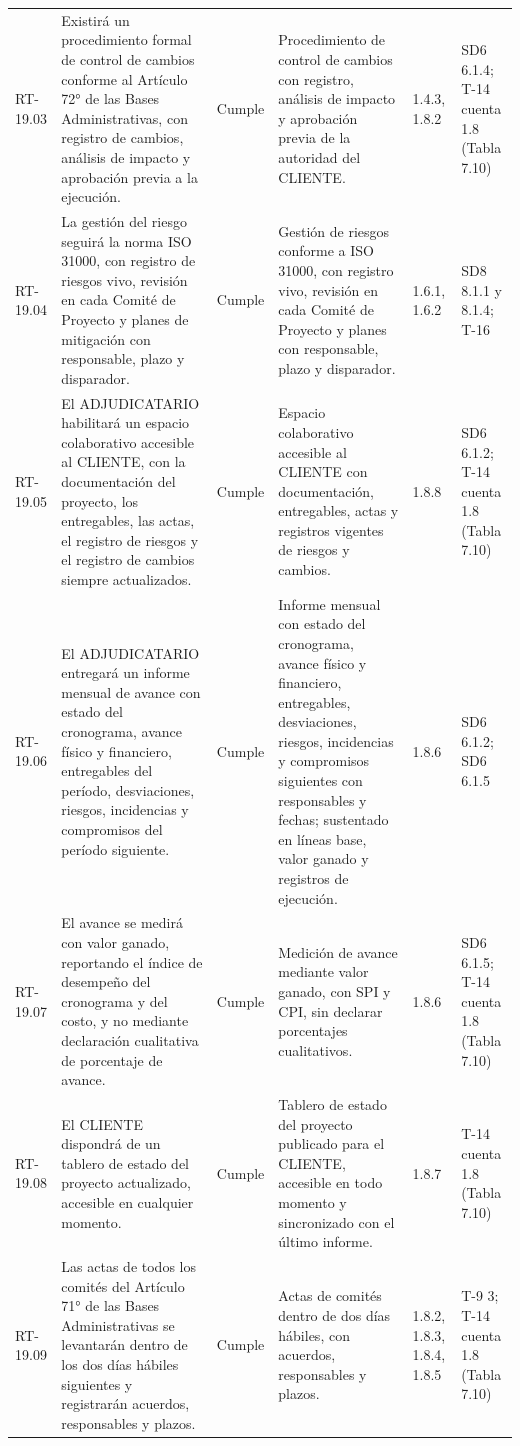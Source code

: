 \documentclass[carta,firma,final]{lafrox}
\begin{document}
\begin{landscape}
{\begin{longtable}{@{}F{0.070} F{0.255} F{0.075} F{0.280} F{0.090} F{0.230}@{}}
  RT-19.03 & Existirá un procedimiento formal de control de cambios conforme al Artículo 72° de las Bases Administrativas, con registro de cambios, análisis de impacto y aprobación previa a la ejecución. & Cumple & Procedimiento de control de cambios con registro, análisis de impacto y aprobación previa de la autoridad del CLIENTE. & 1.4.3, 1.8.2 & SD6 6.1.4; T-14 cuenta 1.8 (Tabla 7.10) \\
  RT-19.04 & La gestión del riesgo seguirá la norma ISO 31000, con registro de riesgos vivo, revisión en cada Comité de Proyecto y planes de mitigación con responsable, plazo y disparador. & Cumple & Gestión de riesgos conforme a ISO 31000, con registro vivo, revisión en cada Comité de Proyecto y planes con responsable, plazo y disparador. & 1.6.1, 1.6.2 & SD8 8.1.1 y 8.1.4; T-16 \\
  RT-19.05 & El ADJUDICATARIO habilitará un espacio colaborativo accesible al CLIENTE, con la documentación del proyecto, los entregables, las actas, el registro de riesgos y el registro de cambios siempre actualizados. & Cumple & Espacio colaborativo accesible al CLIENTE con documentación, entregables, actas y registros vigentes de riesgos y cambios. & 1.8.8 & SD6 6.1.2; T-14 cuenta 1.8 (Tabla 7.10) \\
  RT-19.06 & El ADJUDICATARIO entregará un informe mensual de avance con estado del cronograma, avance físico y financiero, entregables del período, desviaciones, riesgos, incidencias y compromisos del período siguiente. & Cumple & Informe mensual con estado del cronograma, avance físico y financiero, entregables, desviaciones, riesgos, incidencias y compromisos siguientes con responsables y fechas; sustentado en líneas base, valor ganado y registros de ejecución. & 1.8.6 & SD6 6.1.2; SD6 6.1.5 \\
  RT-19.07 & El avance se medirá con valor ganado, reportando el índice de desempeño del cronograma y del costo, y no mediante declaración cualitativa de porcentaje de avance. & Cumple & Medición de avance mediante valor ganado, con SPI y CPI, sin declarar porcentajes cualitativos. & 1.8.6 & SD6 6.1.5; T-14 cuenta 1.8 (Tabla 7.10) \\
  RT-19.08 & El CLIENTE dispondrá de un tablero de estado del proyecto actualizado, accesible en cualquier momento. & Cumple & Tablero de estado del proyecto publicado para el CLIENTE, accesible en todo momento y sincronizado con el último informe. & 1.8.7 & T-14 cuenta 1.8 (Tabla 7.10) \\
  RT-19.09 & Las actas de todos los comités del Artículo 71° de las Bases Administrativas se levantarán dentro de los dos días hábiles siguientes y registrarán acuerdos, responsables y plazos. & Cumple & Actas de comités dentro de dos días hábiles, con acuerdos, responsables y plazos. & 1.8.2, 1.8.3, 1.8.4, 1.8.5 & T-9 3; T-14 cuenta 1.8 (Tabla 7.10) \\

\end{longtable}}
\end{landscape}
\end{document}
